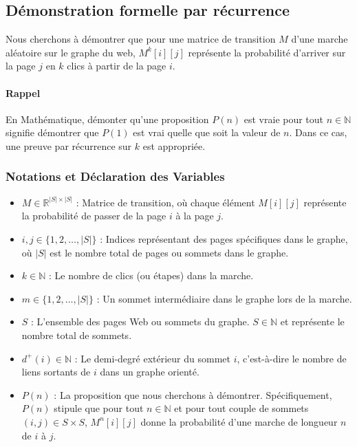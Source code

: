 \subsection{Démonstration formelle par récurrence}

Nous cherchons à démontrer que pour une matrice de transition $M$ d'une marche aléatoire sur le graphe du web, $M^k[i][j]$ représente la probabilité d'arriver sur la page $j$ en $k$ clics à partir de la page $i$.

\paragraph*{Rappel}
En Mathématique, démonter qu'une proposition $P(n)$ est vraie pour tout $n \in \mathbb{N}$ signifie démontrer que $P(1)$ est vrai quelle que soit la valeur de $n$. Dans ce cas, une preuve par récurrence sur $k$ est appropriée.

\subsubsection{Notations et Déclaration des Variables}

\begin{itemize}
    \item $M \in \mathbb{R}^{|S| \times |S|}$ : Matrice de transition, où chaque élément $M[i][j]$ représente la probabilité de passer de la page $i$ à la page $j$.
    \item $i, j \in \{1, 2, \ldots, |S|\}$ : Indices représentant des pages spécifiques dans le graphe, où $|S|$ est le nombre total de pages ou sommets dans le graphe.
    \item $k \in \mathbb{N}$ : Le nombre de clics (ou étapes) dans la marche.
    \item $m \in \{1, 2, \ldots, |S|\}$ : Un sommet intermédiaire dans le graphe lors de la marche.
    \item $S$ : L'ensemble des pages Web ou sommets du graphe. $S \in \mathbb{N}$ et représente le nombre total de sommets.
    \item $d^+(i) \in \mathbb{N}$ : Le demi-degré extérieur du sommet $i$, c'est-à-dire le nombre de liens sortants de $i$ dans un graphe orienté.
    \item $P(n)$ : La proposition que nous cherchons à démontrer. Spécifiquement, $P(n)$ stipule que pour tout $n \in \mathbb{N}$ et pour tout couple de sommets $(i, j) \in S \times S$, $M^n[i][j]$ donne la probabilité d'une marche de longueur $n$ de $i$ à $j$.
\end{itemize}

